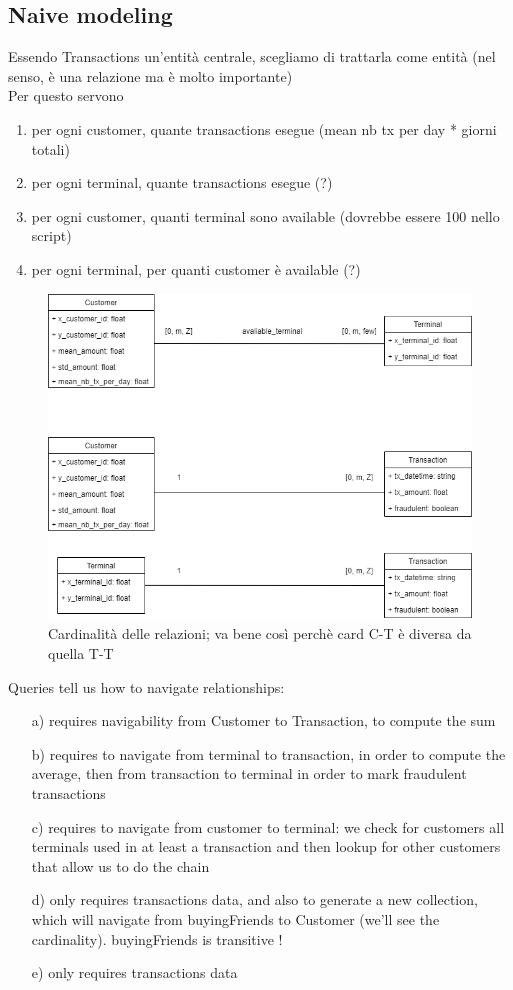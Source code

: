 \documentclass[letterpaper,11pt]{article}
\begin{document}
\subsection{Naive modeling}
Essendo Transactions un'entità centrale, scegliamo di trattarla come entità (nel senso, è una relazione ma è molto importante)
\\
Per questo servono
\begin{enumerate}
    \item per ogni customer, quante transactions esegue (mean nb tx per day * giorni totali)
    \item per ogni terminal, quante transactions esegue  (?)
    \item per ogni customer, quanti terminal sono available (dovrebbe essere 100 nello script)
    \item per ogni terminal, per quanti customer è available (?)
\end{enumerate}
\begin{figure}[ht] 
        \centering \includegraphics[width=0.9\columnwidth]{images/MongoCardinality.png}
        \caption{\label{fig1}Cardinalità delle relazioni; va bene così perchè card C-T è diversa da quella T-T}
\end{figure}
Queries tell us how to navigate relationships:
\begin{enumerate}
    \item[a)] requires navigability from Customer to Transaction, to compute the sum
    \item[b)] requires to navigate from terminal to transaction, in order to compute the average, then from transaction to terminal in order to mark fraudulent transactions
    \item[c)] requires to navigate from customer to terminal: we check for customers all terminals used in at least a transaction and then lookup for other customers that allow us to do the chain
    \item[d)] only requires transactions data, and also to generate a new collection, which will navigate from buyingFriends to Customer (we'll see the cardinality). buyingFriends is transitive !
    \item[e)] only requires transactions data
\end{enumerate}
\end{document}

